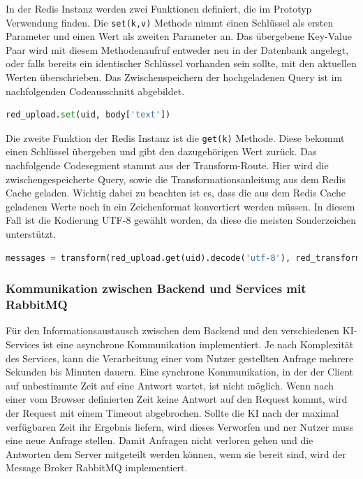 In der Redis Instanz werden zwei Funktionen definiert, die im Prototyp Verwendung finden. Die \texttt{set(k,v)} Methode nimmt einen Schlüssel als ersten Parameter und einen Wert als zweiten Parameter an. Das übergebene Key-Value Paar wird mit diesem Methodenaufruf entweder neu in der Datenbank angelegt, oder falls bereits ein identischer Schlüssel vorhanden sein sollte, mit den aktuellen Werten überschrieben. Das Zwischenspeichern der hochgeladenen Query ist im nachfolgenden Codeausschnitt abgebildet.  

\begin{lstlisting}[language=Python]
red_upload.set(uid, body['text'])
\end{lstlisting}

Die zweite Funktion der Redis Instanz ist die \texttt{get(k)} Methode. Diese bekommt einen Schlüssel übergeben und gibt den dazugehörigen Wert zurück. Das nachfolgende Codesegment stammt aus der Transform-Route. Hier wird die zwischengespeicherte Query, sowie die Transformationsanleitung aus dem Redis Cache geladen. Wichtig dabei zu beachten ist es, dass die aus dem Redis Cache geladenen Werte noch in ein Zeichenformat konvertiert werden müssen. In diesem Fall ist die Kodierung UTF-8 gewählt worden, da diese die meisten Sonderzeichen unterstützt.

\begin{lstlisting}[language=Python]
messages = transform(red_upload.get(uid).decode('utf-8'), red_transform.get(uid))
\end{lstlisting}

\subsubsection{Kommunikation zwischen Backend und Services mit RabbitMQ}
Für den Informationsaustausch zwischen dem Backend und den verschiedenen KI-Services ist eine asynchrone Kommunikation implementiert. Je nach Komplexität des Services, kann die Verarbeitung einer vom Nutzer gestellten Anfrage mehrere Sekunden bis Minuten dauern. Eine synchrone Kommunikation, in der der Client auf unbestimmte Zeit auf eine Antwort wartet, ist nicht möglich. Wenn nach einer vom Browser definierten Zeit keine Antwort auf den Request kommt, wird der Request mit einem Timeout abgebrochen. Sollte die KI nach der maximal verfügbaren Zeit ihr Ergebnis liefern, wird dieses Verworfen und ner Nutzer muss eine neue Anfrage stellen. Damit Anfragen nicht verloren gehen und die Antworten dem Server mitgeteilt werden können, wenn sie bereit sind, wird der Message Broker RabbitMQ implementiert. 

